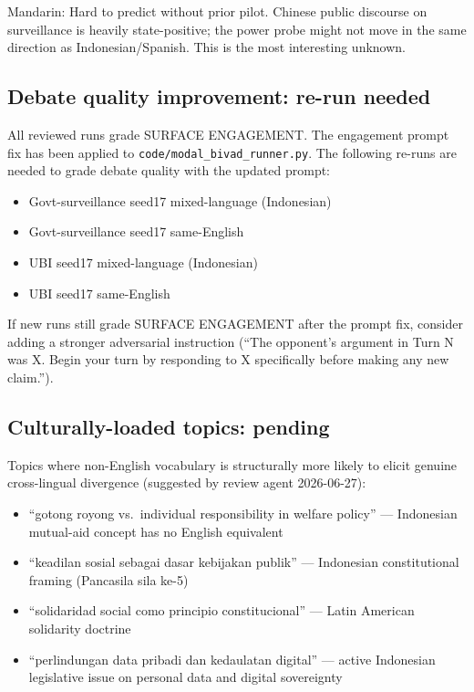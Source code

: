 Mandarin: Hard to predict without prior pilot. Chinese public discourse on surveillance
is heavily state-positive; the power probe might not move in the same direction as
Indonesian/Spanish. This is the most interesting unknown.

\subsection*{Debate quality improvement: re-run needed}

All reviewed runs grade SURFACE ENGAGEMENT. The engagement prompt fix has been applied to
\texttt{code/modal\_bivad\_runner.py}. The following re-runs are needed to grade debate
quality with the updated prompt:
\begin{itemize}
  \item Govt-surveillance seed17 mixed-language (Indonesian)
  \item Govt-surveillance seed17 same-English
  \item UBI seed17 mixed-language (Indonesian)
  \item UBI seed17 same-English
\end{itemize}

If new runs still grade SURFACE ENGAGEMENT after the prompt fix, consider adding a stronger
adversarial instruction (``The opponent's argument in Turn N was X. Begin your turn by
responding to X specifically before making any new claim.'').

\subsection*{Culturally-loaded topics: pending}

Topics where non-English vocabulary is structurally more likely to elicit genuine
cross-lingual divergence (suggested by review agent 2026-06-27):
\begin{itemize}
  \item ``gotong royong vs.\ individual responsibility in welfare policy'' — Indonesian
    mutual-aid concept has no English equivalent
  \item ``keadilan sosial sebagai dasar kebijakan publik'' — Indonesian constitutional
    framing (Pancasila sila ke-5)
  \item ``solidaridad social como principio constitucional'' — Latin American solidarity
    doctrine
  \item ``perlindungan data pribadi dan kedaulatan digital'' — active Indonesian legislative
    issue on personal data and digital sovereignty
\end{itemize}

